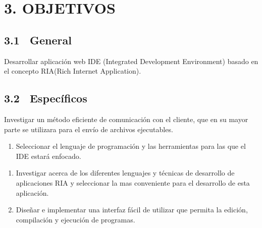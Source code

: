 \documentclass[12pt,letterpaper,oneside]{article}
\begin{document}
\bigskip


\bigskip


\bigskip


\bigskip


\bigskip


\bigskip


\bigskip


\bigskip


\bigskip


\bigskip


\bigskip


\bigskip


\bigskip


\bigskip

\section{3. OBJETIVOS}

\bigskip

\subsection[3.1 \ General]{3.1 \ General}

\bigskip
Desarrollar aplicación web IDE (Integrated Development Environment)
basado en el concepto RIA(Rich Internet Application).


\bigskip

\subsection[3.2 \ Específicos]{3.2 \ Específicos}

\bigskip
Investigar un método eficiente de comunicación con el cliente, que
en su mayor parte se utilizara para el envío de archivos ejecutables.

\bigskip


\begin{enumerate}
\item Seleccionar el lenguaje de programación y las herramientas para
las que el IDE estará enfocado.
\end{enumerate}

\bigskip


\begin{enumerate}
\item Investigar acerca de los diferentes lenguajes y técnicas de
desarrollo de aplicaciones RIA y seleccionar la mas conveniente para el
desarrollo de esta aplicación.


\bigskip
\item Diseñar e implementar una interfaz fácil de utilizar que
permita la edición, compilación y ejecución de programas.
\end{enumerate}
\end{document}
